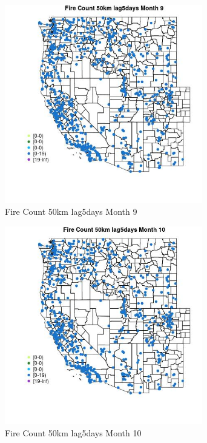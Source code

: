 \begin{figure} 
\centering  
\includegraphics[width=0.77\textwidth]{Code_Outputs/Report_ML_input_PM25_Step4_part_e_de_duplicated_aves_compiled_2019-05-21wNAs_MapObsMo9Fire_Count_50km_lag5days.jpg} 
\caption{\label{fig:Report_ML_input_PM25_Step4_part_e_de_duplicated_aves_compiled_2019-05-21wNAsMapObsMo9Fire_Count_50km_lag5days}Fire Count 50km lag5days Month 9} 
\end{figure} 
 

\begin{figure} 
\centering  
\includegraphics[width=0.77\textwidth]{Code_Outputs/Report_ML_input_PM25_Step4_part_e_de_duplicated_aves_compiled_2019-05-21wNAs_MapObsMo10Fire_Count_50km_lag5days.jpg} 
\caption{\label{fig:Report_ML_input_PM25_Step4_part_e_de_duplicated_aves_compiled_2019-05-21wNAsMapObsMo10Fire_Count_50km_lag5days}Fire Count 50km lag5days Month 10} 
\end{figure} 
 


